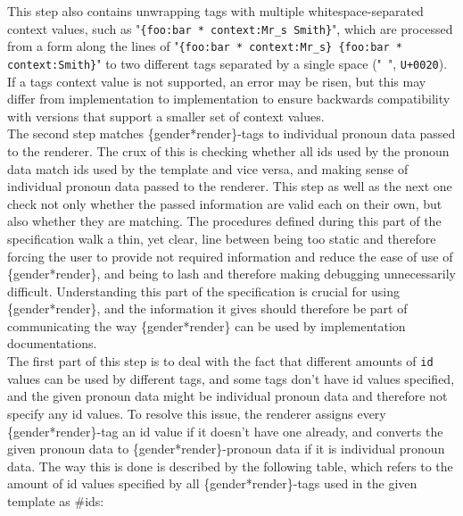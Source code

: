 \documentclass{article}
\begin{document}
    This step also contains unwrapping tags with multiple whitespace-separated context values, such as "\texttt{\{foo:bar * context:Mr\_s Smith\}}", which are processed from a form along the lines of "\texttt{\{foo:bar * context:Mr\_s\} \{foo:bar * context:Smith\}}" to two different tags separated by a single space ("\texttt{ }", \texttt{U+0020}).
    If a tags context value is not supported, an error may be risen, but this may differ from implementation to implementation to ensure backwards compatibility with versions that support a smaller set of context values.\\

    The second step matches \{gender*render\}-tags to individual pronoun data passed to the renderer.
    The crux of this is checking whether all ids used by the pronoun data match ids used by the template and vice versa, and making sense of individual pronoun data passed to the renderer.
    This step as well as the next one check not only whether the passed information are valid each on their own, but also whether they are matching.
    The procedures defined during this part of the specification walk a thin, yet clear, line between being too static and therefore forcing the user to provide not required information and reduce the ease of use of \{gender*render\}, and being to lash and therefore making debugging unnecessarily difficult.
    Understanding this part of the specification is crucial for using \{gender*render\}, and the information it gives should therefore be part of communicating the way \{gender*render\} can be used by implementation documentations.\\

    The first part of this step is to deal with the fact that different amounts of \texttt{id} values can be used by different tags, and some tags don't have id values specified, and the given pronoun data might be individual pronoun data and therefore not specify any id values.
    To resolve this issue, the renderer assigns every \{gender*render\}-tag an id value if it doesn't have one already, and converts the given pronoun data to \{gender*render\}-pronoun data if it is individual pronoun data.
    The way this is done is described by the following table, which refers to the amount of id values specified by all \{gender*render\}-tags used in the given template as \#ids:
\end{document}
